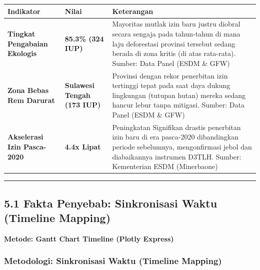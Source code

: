 \documentclass[
]{article}
\newcounter{none} %
\begin{document}
{\def\LTcaptype{none} %
\begin{longtable}[]{@{}
  >{\raggedright\arraybackslash}p{}
  >{\raggedright\arraybackslash}p{}
  >{\raggedright\arraybackslash}p{}@{}}
\toprule\noalign{}
\begin{minipage}[b]{\linewidth}\raggedright
Indikator
\end{minipage} & \begin{minipage}[b]{\linewidth}\raggedright
Nilai
\end{minipage} & \begin{minipage}[b]{\linewidth}\raggedright
Keterangan
\end{minipage} \\
\midrule\noalign{}
\endhead
\bottomrule\noalign{}
\endlastfoot
\textbf{Tingkat Pengabaian Ekologis} & \textbf{85.3\% (324 IUP)} &
Mayoritas mutlak izin baru justru diobral secara sengaja pada
tahun-tahun di mana laju deforestasi provinsi tersebut sedang berada di
zona kritis (di atas rata-rata). Sumber: Data Panel (ESDM \& GFW) \\
\textbf{Zona Bebas Rem Darurat} & \textbf{Sulawesi Tengah (173 IUP)} &
Provinsi dengan rekor penerbitan izin tertinggi tepat pada saat daya
dukung lingkungan (tutupan hutan) mereka sedang hancur lebur tanpa
mitigasi. Sumber: Data Panel (ESDM \& GFW) \\
\textbf{Akselerasi Izin Pasca-2020} & \textbf{4.4x Lipat} & Peningkatan
Signifikan drastis penerbitan izin baru di era pasca-2020 dibandingkan
periode sebelumnya, mengonfirmasi jebol dan diabaikannya instrumen
D3TLH. Sumber: Kementerian ESDM (Minerbaone) \\
\end{longtable}
}

\begin{center}\rule{0.5\linewidth}{0.5pt}\end{center}

\subsection{5.1 Fakta Penyebab: Sinkronisasi Waktu (Timeline
Mapping)}\label{fakta-penyebab-sinkronisasi-waktu-timeline-mapping}

\textbf{Metode: Gantt Chart Timeline (Plotly Express)}

\subsubsection{Metodologi: Sinkronisasi Waktu (Timeline
Mapping)}\label{metodologi-sinkronisasi-waktu-timeline-mapping}
\end{document}
